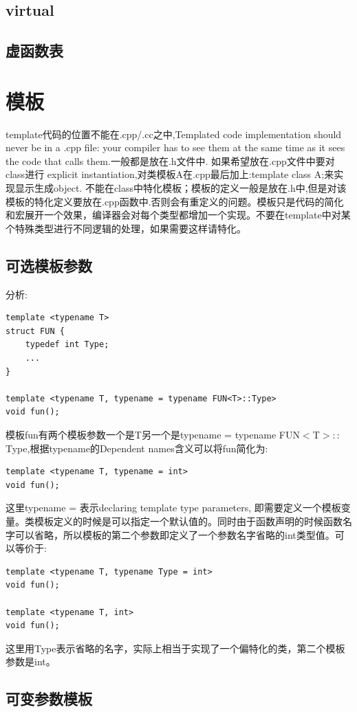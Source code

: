 \documentclass[12pt]{book}
\begin{document}
\subsection{virtual}
\subsection{虚函数表}
\section{模板}
template代码的位置不能在.cpp/.cc之中,Templated code implementation should never be in a .cpp file: your compiler has to see them at the same time as it sees the code that calls them.一般都是放在.h文件中. 如果希望放在.cpp文件中要对class进行 explicit instantiation,对类模板A在.cpp最后加上:template class A;来实现显示生成object. 不能在class中特化模板；模板的定义一般是放在.h中,但是对该模板的特化定义要放在.cpp函数中.否则会有重定义的问题。模板只是代码的简化和宏展开一个效果，编译器会对每个类型都增加一个实现。不要在template中对某个特殊类型进行不同逻辑的处理，如果需要这样请特化。

\subsection{可选模板参数}
分析:
\begin{lstlisting}
template <typename T>
struct FUN {
	typedef int Type;
	...
}

template <typename T, typename = typename FUN<T>::Type>
void fun();
\end{lstlisting}
模板fun有两个模板参数一个是T另一个是typename = typename FUN$<$T$>::$Type,根据typename的Dependent names含义可以将fun简化为:
\begin{lstlisting}
template <typename T, typename = int>
void fun();
\end{lstlisting}
这里typename = 表示declaring template type parameters, 即需要定义一个模板变量。类模板定义的时候是可以指定一个默认值的。同时由于函数声明的时候函数名字可以省略，所以模板的第二个参数即定义了一个参数名字省略的int类型值。可以等价于:
\begin{lstlisting}
template <typename T, typename Type = int>
void fun();
	
template <typename T, int>
void fun();
\end{lstlisting}
这里用Type表示省略的名字，实际上相当于实现了一个偏特化的类，第二个模板参数是int。

\subsection{可变参数模板}
\end{document}
